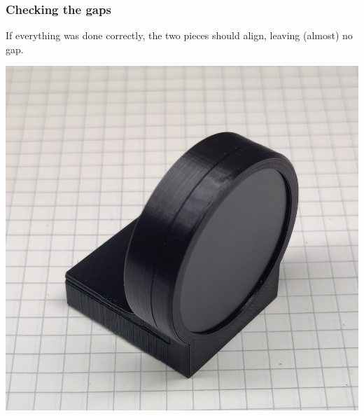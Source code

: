 \documentclass[]{article}
\begin{document}
\subsubsection{Checking the gaps}
\begin{minipage}[t]{0.5\linewidth}
	\vspace{0pt}
	If everything was done correctly, the two pieces should align, leaving (almost) no gap.
\end{minipage}
\hfill
\begin{minipage}[t]{0.4\linewidth}
	\vspace{0pt}
	\includegraphics[width=\linewidth]{images/01_displayunit/18_check_gaps.jpg}
\end{minipage}
\end{document}
